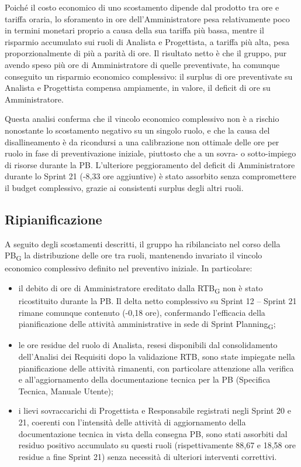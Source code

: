 Poiché il costo economico di uno scostamento dipende dal prodotto tra ore e
tariffa oraria, lo sforamento in ore dell'Amministratore pesa relativamente
poco in termini monetari proprio a causa della sua tariffa più bassa, mentre
il risparmio accumulato sui ruoli di Analista e Progettista, a tariffa più
alta, pesa proporzionalmente di più a parità di ore. Il risultato netto è
che il gruppo, pur avendo speso più ore di Amministratore di quelle
preventivate, ha comunque conseguito un risparmio economico complessivo:
il surplus di ore preventivate su Analista e Progettista compensa
ampiamente, in valore, il deficit di ore su Amministratore.

Questa analisi conferma che il vincolo economico complessivo non è a
rischio nonostante lo scostamento negativo su un singolo ruolo, e che la
causa del disallineamento è da ricondursi a una calibrazione non ottimale
delle ore per ruolo in fase di preventivazione iniziale, piuttosto che a un
sovra- o sotto-impiego di risorse durante la PB. L'ulteriore peggioramento
del deficit di Amministratore durante lo Sprint 21 (-8,33 ore aggiuntive)
è stato assorbito senza compromettere il budget complessivo, grazie ai
consistenti surplus degli altri ruoli.

\subsection{Ripianificazione}

A seguito degli scostamenti descritti, il gruppo ha ribilanciato nel corso
della PB\textsubscript{G} la distribuzione delle ore tra ruoli,
mantenendo invariato il vincolo economico complessivo definito nel preventivo
iniziale. In particolare:
\begin{itemize}
    \item il debito di ore di Amministratore ereditato dalla RTB\textsubscript{G}
    non è stato ricostituito durante la PB. Il delta netto complessivo su Sprint 12 -- Sprint 21
    rimane comunque contenuto (-0,18 ore), confermando l'efficacia della
    pianificazione delle attività amministrative in sede di Sprint
    Planning\textsubscript{G};
    \item le ore residue del ruolo di Analista, resesi disponibili dal
    consolidamento dell'Analisi dei Requisiti dopo la validazione RTB, sono
    state impiegate nella pianificazione delle attività rimanenti, con
    particolare attenzione alla verifica e all'aggiornamento della
    documentazione tecnica per la PB (Specifica Tecnica, Manuale Utente);
    \item i lievi sovraccarichi di Progettista e Responsabile registrati
    negli Sprint 20 e 21, coerenti con l'intensità delle attività di
    aggiornamento della documentazione tecnica in vista della consegna PB,
    sono stati assorbiti dal residuo positivo accumulato su questi ruoli
    (rispettivamente 88,67 e 18,58 ore residue a fine Sprint 21) senza
    necessità di ulteriori interventi correttivi.
\end{itemize}

